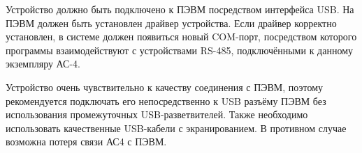 Устройство должно быть подключено к ПЭВМ посредством интерфейса USB. На ПЭВМ должен быть установлен драйвер устройства. Если драйвер корректно установлен, в системе должен появиться новый COM-порт, посредством которого программы взаимодействуют с устройствами RS-485, подключёнными к данному экземпляру АС-4.

\IMPORTANT Устройство очень чувствительно к качеству соединения с ПЭВМ, поэтому рекомендуется подключать его непосредственно к USB разъёму ПЭВМ без использования промежуточных USB-разветвителей. Также необходимо использовать качественные USB-кабели с экранированием. В противном случае возможна потеря связи АС4 с ПЭВМ.